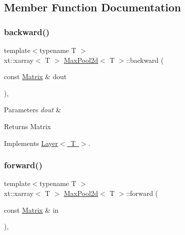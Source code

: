 \subsection{Member Function Documentation}
\mbox{\label{class_max_pool2d_a05cc96411753ff4c0c79a1543af9e795}} 
\subsubsection{\texorpdfstring{backward()}{backward()}}
{\footnotesize\ttfamily template$<$typename T $>$ \\
xt\+::xarray$<$ T $>$ \mbox{\hyperlink{class_max_pool2d}{Max\+Pool2d}}$<$ T $>$\+::backward (\begin{DoxyParamCaption}\item[{const \mbox{\hyperlink{class_layer_a22b1e7286096aa62bd245536c8ebdaf1}{Matrix}} \&}]{dout }\end{DoxyParamCaption})\hspace{0.3cm}{\ttfamily [override]}, {\ttfamily [virtual]}}


\begin{DoxyParams}{Parameters}
{\em dout} & \\
\hline
\end{DoxyParams}
\begin{DoxyReturn}{Returns}
Matrix 
\end{DoxyReturn}


Implements \mbox{\hyperlink{class_layer_ac4c13a3a85bfdd4d7d4d18669e3299fe}{Layer$<$ T $>$}}.

\mbox{\label{class_max_pool2d_a424de7878c64a058a8549362dae448f0}} 
\subsubsection{\texorpdfstring{forward()}{forward()}}
{\footnotesize\ttfamily template$<$typename T $>$ \\
xt\+::xarray$<$ T $>$ \mbox{\hyperlink{class_max_pool2d}{Max\+Pool2d}}$<$ T $>$\+::forward (\begin{DoxyParamCaption}\item[{const \mbox{\hyperlink{class_layer_a22b1e7286096aa62bd245536c8ebdaf1}{Matrix}} \&}]{in }\end{DoxyParamCaption})\hspace{0.3cm}{\ttfamily [override]}, {\ttfamily [virtual]}}


